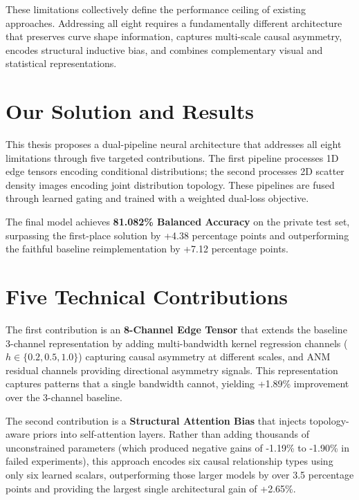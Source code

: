 These limitations collectively define the performance ceiling of existing approaches. Addressing all eight requires a fundamentally different architecture that preserves curve shape information, captures multi-scale causal asymmetry, encodes structural inductive bias, and combines complementary visual and statistical representations.

\section{Our Solution and Results}
\label{sec:solution}

This thesis proposes a dual-pipeline neural architecture that addresses all eight limitations through five targeted contributions. The first pipeline processes 1D edge tensors encoding conditional distributions; the second processes 2D scatter density images encoding joint distribution topology. These pipelines are fused through learned gating and trained with a weighted dual-loss objective.

The final model achieves \textbf{81.082\% Balanced Accuracy} on the private test set, surpassing the first-place solution by +4.38 percentage points and outperforming the faithful baseline reimplementation by +7.12 percentage points.

\section{Five Technical Contributions}
\label{sec:contributions}

The first contribution is an \textbf{8-Channel Edge Tensor} that extends the baseline 3-channel representation by adding multi-bandwidth kernel regression channels ($h\in\{0.2,0.5,1.0\}$) capturing causal asymmetry at different scales, and ANM residual channels providing directional asymmetry signals. This representation captures patterns that a single bandwidth cannot, yielding +1.89\% improvement over the 3-channel baseline.

The second contribution is a \textbf{Structural Attention Bias} that injects topology-aware priors into self-attention layers. Rather than adding thousands of unconstrained parameters (which produced negative gains of -1.19\% to -1.90\% in failed experiments), this approach encodes six causal relationship types using only six learned scalars, outperforming those larger models by over 3.5 percentage points and providing the largest single architectural gain of +2.65\%.

